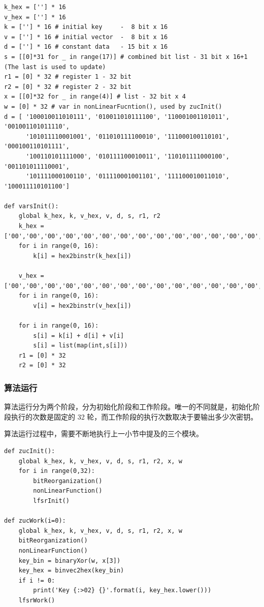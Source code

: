 \begin{lstlisting}[style=myPython,label={lst:varsinit},caption={变量初始化}]
k_hex = [''] * 16
v_hex = [''] * 16
k = [''] * 16 # initial key     -  8 bit x 16
v = [''] * 16 # initial vector  -  8 bit x 16
d = [''] * 16 # constant data   - 15 bit x 16
s = [[0]*31 for _ in range(17)] # combined bit list - 31 bit x 16+1 (The last is used to update)
r1 = [0] * 32 # register 1 - 32 bit
r2 = [0] * 32 # register 2 - 32 bit
x = [[0]*32 for _ in range(4)] # list - 32 bit x 4
w = [0] * 32 # var in nonLinearFucntion(), used by zucInit()
d = [ '100010011010111', '010011010111100', '110001001101011', '001001101011110',
      '101011110001001', '011010111100010', '111000100110101', '000100110101111',
      '100110101111000', '010111100010011', '110101111000100', '001101011110001',
      '101111000100110', '011110001001101', '111100010011010', '100011110101100']

def varsInit():
    global k_hex, k, v_hex, v, d, s, r1, r2
    k_hex = ['00','00','00','00','00','00','00','00','00','00','00','00','00','00','00','00']
    for i in range(0, 16):
        k[i] = hex2binstr(k_hex[i])

    v_hex = ['00','00','00','00','00','00','00','00','00','00','00','00','00','00','00','00']
    for i in range(0, 16):
        v[i] = hex2binstr(v_hex[i])

    for i in range(0, 16):
        s[i] = k[i] + d[i] + v[i]
        s[i] = list(map(int,s[i]))
    r1 = [0] * 32
    r2 = [0] * 32

\end{lstlisting}

\subsubsection{算法运行}
算法运行分为两个阶段，分为初始化阶段和工作阶段。唯一的不同就是，初始化阶段执行的次数是固定的 32 轮，而工作阶段的执行次数取决于要输出多少次密钥。

算法运行过程中，需要不断地执行上一小节中提及的三个模块。

\begin{lstlisting}[style=myPython,label={lst:zuc},caption={算法初始化阶段和工作阶段}]
def zucInit():
    global k_hex, k, v_hex, v, d, s, r1, r2, x, w
    for i in range(0,32):
        bitReorganization()
        nonLinearFunction()
        lfsrInit()

def zucWork(i=0):
    global k_hex, k, v_hex, v, d, s, r1, r2, x, w
    bitReorganization()
    nonLinearFunction()
    key_bin = binaryXor(w, x[3])
    key_hex = binvec2hex(key_bin)
    if i != 0:
        print('Key {:>02} {}'.format(i, key_hex.lower()))
    lfsrWork()
\end{lstlisting}

